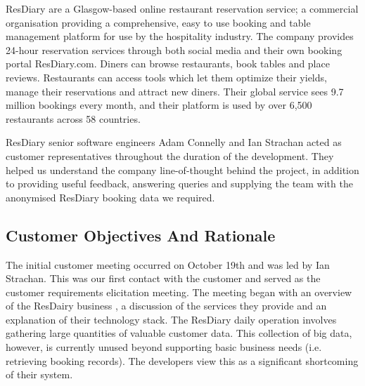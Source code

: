 \documentclass{l3proj}
\begin{document}

ResDiary are a Glasgow-based online restaurant reservation service; a commercial organisation providing a comprehensive, easy to use booking and table management platform for use by the hospitality industry. The company provides 24-hour reservation services through both social media and their own booking portal ResDiary.com. Diners can browse restaurants, book tables and place reviews. Restaurants can access tools which let them optimize their yields, manage their reservations and attract new diners. Their global service sees 9.7 million bookings every month, and their platform is used by over 6,500 restaurants across 58 countries. 

ResDiary senior software engineers Adam Connelly and Ian Strachan acted as customer representatives throughout the duration of the development. They helped us understand the company line-of-thought behind the project, in addition to providing useful feedback, answering queries and supplying the team with the anonymised ResDiary booking data we required.


\subsection{Customer Objectives And Rationale}
\label{sec:custobjectives}



The initial customer meeting occurred on October 19th and was led by Ian Strachan. This was our first contact with the customer and served as the customer requirements elicitation meeting. The meeting began with an overview of the ResDairy business
, a discussion of the services they provide and an explanation of their technology stack. The ResDiary daily operation involves gathering large quantities of valuable customer data. This collection of big data, however, is currently unused beyond supporting basic business needs (i.e. retrieving booking records). The developers view this as a significant shortcoming of their system.
\end{document}
